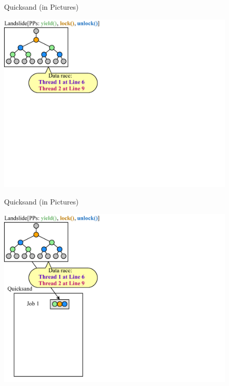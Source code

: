 \documentclass[xcolor=dvipsnames]{beamer}
\begin{document}
\begin{frame}{Quicksand (in Pictures)}
	\begin{center}
	\vspace{-0.88em}
	\includegraphics[width=0.86\textwidth]{../../oopsla/dr-jobs-1.pdf}
	\end{center}
\end{frame}
\begin{frame}{Quicksand (in Pictures)}
	\begin{center}
	\vspace{-0.88em}
	\includegraphics[width=0.86\textwidth]{../../oopsla/dr-jobs-2.pdf}
	\end{center}
\end{frame}
\end{document}
